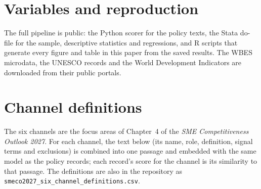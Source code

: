\documentclass[11pt]{article}
\begin{document}
\appendix
\renewcommand{\thetable}{A\arabic{table}}
\setcounter{table}{0}

\section{Variables and reproduction}\label{app:vars}

\begin{table}[H]
  \caption{Outcome definitions}\label{tab:vars}
  \small
  
\end{table}

The full pipeline is public: the Python scorer for the policy texts, the Stata do-file for the sample, descriptive statistics and regressions, and R scripts that generate every figure and table in this paper from the saved results. The WBES microdata, the UNESCO records and the World Development Indicators are downloaded from their public portals.

\section{Channel definitions}\label{app:channels}

The six channels are the focus areas of Chapter~4 of the \emph{SME Competitiveness Outlook 2027}. For each channel, the text below (its name, role, definition, signal terms and exclusions) is combined into one passage and embedded with the same model as the policy records; each record's score for the channel is its similarity to that passage. The definitions are also in the repository as \texttt{smeco2027\_six\_channel\_definitions.csv}.

{\small

}
\end{document}
